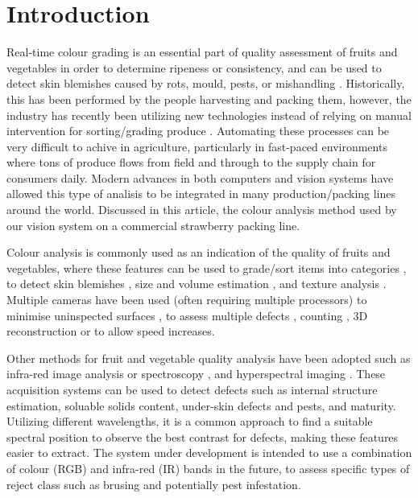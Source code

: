 \documentclass[conference]{IEEEtran}
\begin{document}





\IEEEpeerreviewmaketitle

\section{Introduction}

Real-time colour grading is an essential part of quality assessment of fruits and vegetables in order to determine ripeness or consistency, and can be used to detect skin blemishes caused by rots, mould, pests, or mishandling \cite{blasco}. Historically, this has been performed by the people harvesting and packing them, however, the industry has recently been utilizing new technologies instead of relying on manual intervention for sorting/grading produce \cite{londhe}. Automating these processes can be very difficult to achive in agriculture, particularly in fast-paced environments where tons of produce flows from field and through to the supply chain for consumers daily. Modern advances in both computers and vision systems have allowed this type of analisis to be integrated in many production/packing lines around the world. Discussed in this article, the colour analysis method used by our vision system on a commercial strawberry packing line.

Colour analysis is commonly used as an indication of the quality of fruits and vegetables, where these features can be used to grade/sort items into categories \cite{jun, elmasry}, to detect skin blemishes \cite{blasco, leemans}, size and volume estimation \cite{bundit, elmasry}, and texture analysis \cite{jun, rakuna}. Multiple cameras have been used (often requiring multiple processors) to minimise uninspected surfaces \cite{zouxiou, quingzong}, to assess multiple defects \cite{blasko2}, counting \cite{song}, 3D reconstruction \cite{panitat} or to allow speed increases\cite{recce}.   

Other methods for fruit and vegetable quality analysis have been adopted such as infra-red image analysis or spectroscopy \cite{guthrie, bureau, yande}, and hyperspectral imaging \cite{renfu} \cite{jianwei, mendoza, rajkumar}. These acquisition systems can be used to detect defects such as internal structure estimation, soluable solids content, under-skin defects and pests, and maturity. Utilizing different wavelengths, it is a common approach to find a suitable spectral position to observe the best contrast for defects, making these features easier to extract\cite{ariana, piotr}. The system under development is intended to use a combination of colour (RGB) and infra-red (IR) bands in the future, to assess specific types of reject class such as brusing and potentially pest infestation. 
\end{document}
